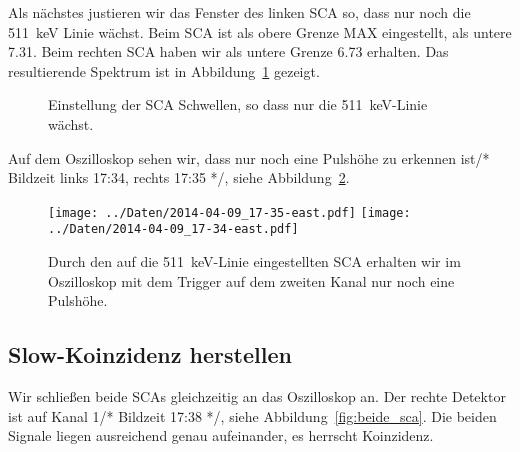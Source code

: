 Als nächstes justieren wir das Fenster des linken SCA so, dass nur noch die
\SI{511}{\kilo\electronvolt} Linie wächst. Beim SCA ist als obere Grenze MAX
eingestellt, als untere \num{7.31}. Beim rechten SCA haben wir als untere
Grenze \num{6.73} erhalten. Das resultierende Spektrum ist in
Abbildung~\ref{mca:fenster} gezeigt.

\begin{figure}[htbp]
    \centering
    \hfill
    \caption{%
        Einstellung der SCA Schwellen, so dass nur die
        \SI{511}{\kilo\electronvolt}-Linie wächst.
    }
    \label{mca:fenster}
\end{figure}

Auf dem Oszilloskop sehen wir, dass nur noch eine Pulshöhe zu erkennen ist/* Bildzeit
links 17:34, rechts 17:35 */, siehe Abbildung~\ref{fig:eine_pulshoehe}.

\begin{figure}[htbp]
    \centering
    \texttt{[image: ../Daten/2014-04-09\_17-35-east.pdf]}
    \hfill
    \texttt{[image: ../Daten/2014-04-09\_17-34-east.pdf]}
    \caption{%
        Durch den auf die \SI{511}{\kilo\electronvolt}-Linie eingestellten SCA
        erhalten wir im Oszilloskop mit dem Trigger auf dem zweiten Kanal nur
        noch eine Pulshöhe.
    }
    \label{fig:eine_pulshoehe}
\end{figure}

\subsection{Slow-Koinzidenz herstellen}

Wir schließen beide SCAs gleichzeitig an das Oszilloskop an. Der rechte Detektor
ist auf Kanal 1/* Bildzeit 17:38 */, siehe Abbildung~\ref{fig:beide_sca}. Die
beiden Signale liegen ausreichend genau aufeinander, es herrscht Koinzidenz.

